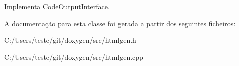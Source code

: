 Implementa \hyperlink{class_code_output_interface_a4ab86013abbf61a86e9c300eb805939a}{Code\-Output\-Interface}.



A documentação para esta classe foi gerada a partir dos seguintes ficheiros\-:\begin{DoxyCompactItemize}
\item 
C\-:/\-Users/teste/git/doxygen/src/htmlgen.\-h\item 
C\-:/\-Users/teste/git/doxygen/src/htmlgen.\-cpp\end{DoxyCompactItemize}
